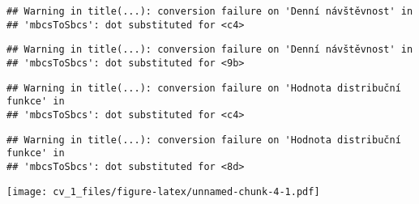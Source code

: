 \documentclass[
]{article}
\begin{document}
\begin{verbatim}
## Warning in title(...): conversion failure on 'Denní návštěvnost' in
## 'mbcsToSbcs': dot substituted for <c4>
\end{verbatim}

\begin{verbatim}
## Warning in title(...): conversion failure on 'Denní návštěvnost' in
## 'mbcsToSbcs': dot substituted for <9b>
\end{verbatim}

\begin{verbatim}
## Warning in title(...): conversion failure on 'Hodnota distribuční funkce' in
## 'mbcsToSbcs': dot substituted for <c4>
\end{verbatim}

\begin{verbatim}
## Warning in title(...): conversion failure on 'Hodnota distribuční funkce' in
## 'mbcsToSbcs': dot substituted for <8d>
\end{verbatim}

\texttt{[image: cv\_1\_files/figure-latex/unnamed-chunk-4-1.pdf]}
\end{document}
